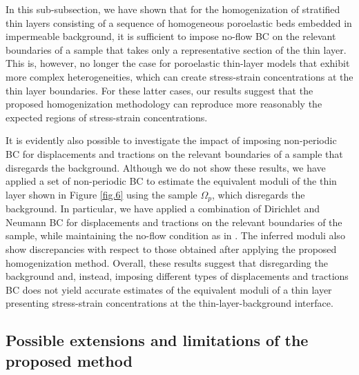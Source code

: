 \documentclass[draft]{agujournal2019}
\begin{document}
In this sub-subsection, we have shown that for the homogenization of stratified thin layers consisting of a sequence of homogeneous poroelastic beds embedded in impermeable background, it is sufficient to impose no-flow BC on the relevant boundaries of a sample that takes only a representative section of the thin layer. This is, however, no longer the case for poroelastic thin-layer models that exhibit more complex heterogeneities, which can create stress-strain concentrations at the thin layer boundaries. For these latter cases, our results suggest that the proposed homogenization methodology can reproduce more reasonably the expected regions of stress-strain concentrations.

It is evidently also possible to investigate
the impact of imposing non-periodic BC for displacements and tractions on the relevant boundaries of a sample that disregards the background. Although we do not show these results, we have applied a set of non-periodic BC to estimate the equivalent moduli of the thin layer shown in Figure \ref{fig.6} using the sample $\Omega_p$, which disregards the background. In particular, we have applied a combination of Dirichlet and Neumann BC for displacements and tractions on the relevant boundaries of the sample, while maintaining the no-flow condition as in . The inferred moduli also show discrepancies with respect to those obtained after applying the proposed homogenization method. Overall, these results suggest that disregarding the background and, instead, imposing different types of displacements and tractions BC does not yield accurate estimates of the equivalent moduli of a thin layer presenting stress-strain concentrations at the thin-layer-background interface. 

\subsection{Possible extensions and limitations of the proposed method}
\end{document}

